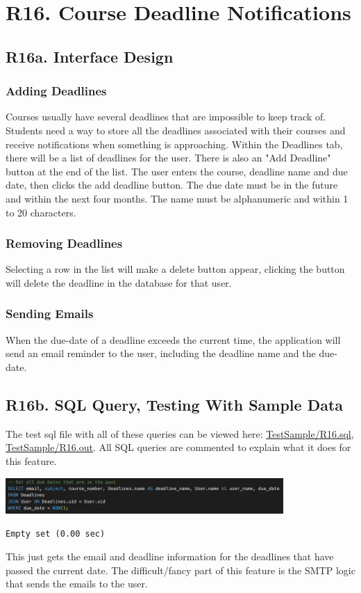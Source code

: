 \documentclass[12pt, a4paper]{article}
\begin{document}
\section*{R16. Course Deadline Notifications}
\label{sec:R16}
\subsection*{R16a. Interface Design}
\subsubsection*{Adding Deadlines}
Courses usually have several deadlines that are impossible to keep track of. Students need a way to store all the deadlines associated with their courses and receive notifications when something is approaching. Within the Deadlines tab, there will be a list of deadlines for the user. There is also an "Add Deadline" button at the end of the list. The user enters the course, deadline name and due date, then clicks the add deadline button. The due date must be in the future and within the next four months. The name must be alphanumeric and within 1 to 20 characters.
\subsubsection*{Removing Deadlines}
Selecting a row in the list will make a delete button appear, clicking the button will delete the deadline in the database for that user.
\subsubsection*{Sending Emails}
When the due-date of a deadline exceeds the current time, the application will send an email reminder to the user, including the deadline name and the due-date.
\subsection*{R16b. SQL Query, Testing With Sample Data}
The test sql file with all of these queries can be viewed here: \underline{\href{https://github.com/Kggupta/DegreeMap/tree/main/Database/Queries/TestSample}{TestSample/R16.sql}}, \underline{\href{https://github.com/Kggupta/DegreeMap/tree/main/Database/Queries/TestSample}{TestSample/R16.out}}. All SQL queries are commented to explain what it does for this feature.
\begin{center}
    \includegraphics[width=400px]{R16/q1}
    \begin{verbatim}
Empty set (0.00 sec)
    \end{verbatim}
\end{center}
This just gets the email and deadline information for the deadlines that have passed the current date.
The difficult/fancy part of this feature is the SMTP logic that sends the emails to the user.
\end{document}
